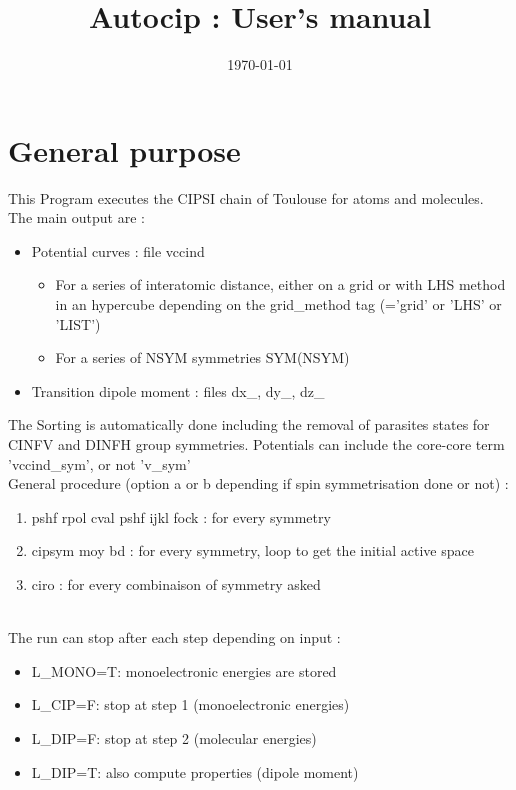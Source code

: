 \documentclass[a4paper,10pt]{article}
\title{Autocip : User's manual}
\author{}
\date{\today}
\begin{document}
\maketitle

\section{General purpose}

This Program executes the CIPSI chain of Toulouse for atoms and molecules.
The main output are :
\begin{itemize}
 \item{Potential curves : file vccind}
 \begin{itemize}
  \item{For a series of interatomic distance, either on a grid or with LHS method in an hypercube
     depending on the grid\_method tag (='grid' or 'LHS' or 'LIST')}
  \item{For a series of NSYM symmetries SYM(NSYM)}
 \end{itemize}
 \item{Transition dipole moment : files dx\_, dy\_, dz\_}
\end{itemize}

The Sorting is automatically done including the removal of parasites states for CINFV and DINFH group symmetries. Potentials can include the core-core term 'vccind\_sym', or not 'v\_sym'
\\[12pt]
General procedure (option a or b depending if spin symmetrisation done or not) :
\begin{enumerate}
\item{pshf rpol cval pshf ijkl fock	: for every symmetry }
\item{cipsym moy bd			: for every symmetry, loop to get the initial active space}
\item{ciro                          	: for every combinaison of symmetry asked}
\end{enumerate}~
\\[12pt]
The run can stop after each step depending on input :
\begin{itemize}
 \item{L\_MONO=T: monoelectronic energies are stored}
 \item{L\_CIP=F: stop at step 1 (monoelectronic energies)}
\item{ L\_DIP=F: stop at step 2 (molecular energies)}
 \item{L\_DIP=T: also compute properties (dipole moment)}
\end{itemize}
\end{document}
